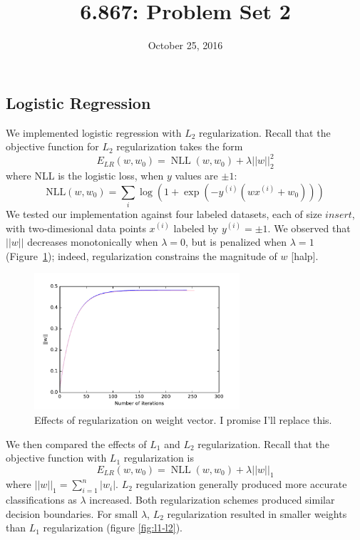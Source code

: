 \documentclass{article}
\title{6.867: Problem Set 2}
\date{October 25, 2016}
\DeclareMathOperator{\NLL}{NLL}
\newcommand{\sind}[1]{^{(#1)}}
\begin{document}
\maketitle

\begin{multicols}{2}


\section{Logistic Regression}

We implemented logistic regression with $L_2$ regularization.
Recall that the objective function for $L_2$ regularization takes the form
\begin{equation}
    E_{LR}(w, w_0) = \NLL(w, w_0) + \lambda ||w||_2^2
\end{equation}
where NLL is the logistic loss, when $y$ values are $\pm 1$:
\begin{equation}
    \text{NLL}(w, w_0) = \sum_i{\log(1+\exp(-y^{(i)}(wx^{(i)}+w_0)))}
\end{equation}
We tested our implementation against four labeled datasets,
each of size $insert$, %
with two-dimesional data points $x\sind{i}$ labeled by $y\sind{i} = \pm1$.
We observed that $||w||$ decreases monotonically when $\lambda=0$,  %
but is penalized when $\lambda=1$ (Figure~\ref{fig:weight-regularization});
indeed, regularization constrains the magnitude of $w$ [halp].  %

\begin{figure}
   \centering
   \includegraphics[width=3in]{img/1-1-weights.pdf}
   \caption{Effects of regularization on weight vector. I promise I'll replace this.}
   \label{fig:weight-regularization}
\end{figure}

We then compared the effects of $L_1$ and $L_2$ regularization.
Recall that the objective function with $L_1$ regularization is
\begin{equation}
    E_{LR}(w, w_0) = \NLL(w, w_0) + \lambda ||w||_1
\end{equation}
where $||w||_1 = \sum_{i=1}^n{|w_i|}$.
$L_2$ regularization generally produced
more accurate classifications as $\lambda$ increased.
Both regularization schemes produced similar decision boundaries.
For small $\lambda$,
$L_2$ regularization resulted in smaller weights
than $L_1$ regularization (figure \ref{fig:l1-l2}).


\end{multicols}
\end{document}

